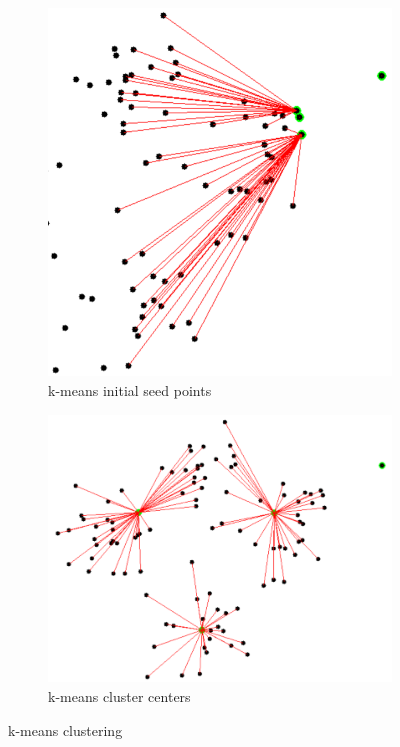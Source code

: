 \begin{figure}[h!]
	\begin{subfigure}{0.49\textwidth}
		\centerline{
			\includegraphics[scale=0.5]{images/kmeansSeeds.png}}
		\caption{k-means initial seed points \cite{shabalinKmeansClusteringKmeans2024}}\label{fig:kmeans1}
	\end{subfigure}
	\begin{subfigure}{0.49\textwidth}
		\centerline{
			\includegraphics[scale=0.5]{images/kmeansClusters.png}}
		\caption{k-means cluster centers \cite{shabalinKmeansClusteringKmeans2024}}\label{fig:kmeans2}
	\end{subfigure}
	\caption{k-means clustering}\label{fig:kmeans}
\end{figure}
